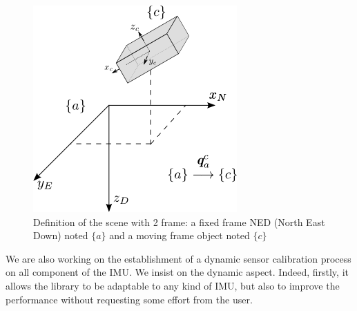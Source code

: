 \begin{figure}
\centering
\includegraphics[scale=0.65]{images/Schema_situation.png}
\caption{Definition of the scene with 2 frame:  a fixed frame NED (North East Down) noted $\{a\}$ and a moving frame object noted $\{c\}$}
\label{Schema_situation}
\end{figure}

%
%
%
%
%
%	
%
%		
%		
%		
%		
%

We are also working on the establishment of a dynamic sensor calibration process on all component of the IMU. We insist on the dynamic aspect. Indeed, firstly, it allows  the library to be adaptable to any kind of IMU, but also to improve the performance without requesting some effort from the user.
